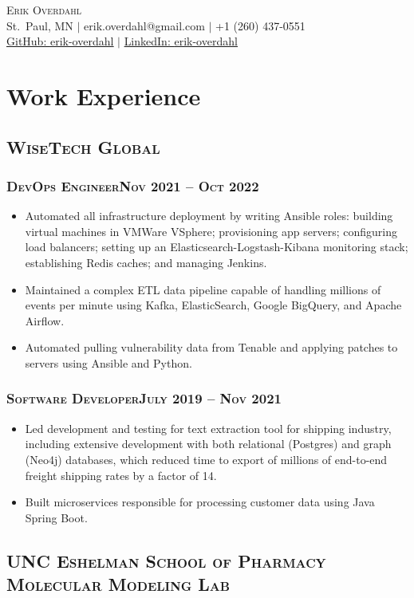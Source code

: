 \documentclass{article}
\newcommand{\resumeSection}[1]{\section*{#1}}
\newcommand{\institution}[1]{\subsection*{\scshape{#1}}}
\newcommand{\jobPosition}[3]{\subsubsection*{\scshape{#1}\hfill #2 -- #3}}
\begin{document}
\begin{center}
  {\Huge\scshape{Erik Overdahl}}
  \\\vspace{3pt}
  \normalsize{
    St.\ Paul, MN
    $|$
    erik.overdahl@gmail.com
    $|$
    +1 (260) 437-0551
    \\
    \href{https://github.com/erik-overdahl}{GitHub: \underline{erik-overdahl}}
    $|$
    \href{https://linkedin.com/in/erik-overdahl}{LinkedIn: \underline{erik-overdahl}}
  }
\end{center}

\resumeSection{Work Experience}

  \institution{WiseTech Global}

    \jobPosition{DevOps Engineer}{Nov 2021}{Oct 2022}
    \begin{itemize}[noitemsep]
      \item
            Automated all infrastructure deployment by writing Ansible
            roles: building virtual machines in VMWare VSphere; provisioning app
            servers; configuring load balancers; setting up an
            Elasticsearch-Logstash-Kibana monitoring stack; establishing Redis
            caches; and managing Jenkins.
      \item
            Maintained a complex ETL data pipeline capable of handling
            millions of events per minute using Kafka, ElasticSearch, Google BigQuery,
            and Apache Airflow.
      \item
            Automated pulling vulnerability data from Tenable and
            applying patches to servers using Ansible and Python.
    \end{itemize}

    \jobPosition{Software Developer}{July 2019}{Nov 2021}
    \begin{itemize}[noitemsep]
      \item
            Led development and testing for text extraction tool for
            shipping industry, including extensive development with
            both relational (Postgres) and graph (Neo4j) databases, which reduced time to
            export of millions of end-to-end freight shipping rates by
            a factor of 14.
      \item
            Built microservices responsible for processing customer
            data using Java Spring Boot.
    \end{itemize}

  \institution{UNC Eshelman School of Pharmacy Molecular Modeling Lab}
\end{document}
